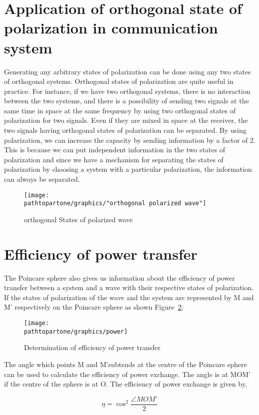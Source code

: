 \section{Application of orthogonal state of polarization in communication system}	
Generating any arbitrary states of polarization can be done using any two states of orthogonal systems. Orthogonal states of polarization are quite useful in practice. For instance, if we have two orthogonal systems, there is no interaction between the two systems, and there is a possibility of sending two signals at the same time in space at the same frequency by using two orthogonal states of polarization for two signals. Even if they are mixed in space at the receiver, the two signals having orthogonal states of polarization can be separated. By using polarization, we can increase the capacity by sending information by a factor of 2. This is because we can put independent information in the two states of polarization and since we have a mechanism for separating the states of polarization by choosing a system with a particular polarization, the information can always be separated.	
\begin{figure}[h]
\centering
\texttt{[image: \\pathtopartone/graphics/"orthogonal polarized wave"]}
\caption{orthogonal States of polarized wave}
\label{fig:orthogonal-polarized-wave}
\end{figure}


\section{Efficiency of power transfer}
The Poincare sphere also gives us information about the efficiency of power transfer between a system and a wave with their respective states of polarization. If the states of polarization of the wave and the system are represented by M and M' respectively on the Poincare sphere as shown Figure~\ref{fig:power};
\begin{figure}[h]
\centering
\texttt{[image: \\pathtopartone/graphics/power]}
\caption{Determination of efficiency of power transfer}
\label{fig:power}
\end{figure}

The angle which points M and M'subtends at the centre of the Poincare sphere can be used to calculate the efficiency of power exchange.
The angle is at MOM' if the centre of the sphere is at O. The efficiency of power exchange is given by,

\[\eta = \cos^2 {\frac{ \angle  MOM' }{2}}  \]

